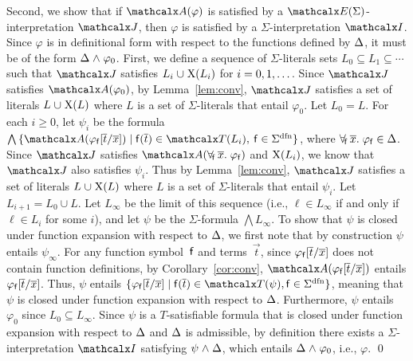\begin{longv}
\begin{proofsketch}
Second, we show that if $\conv( \varphi )$ is satisfied by a
$\extendsig{\Sigma}$-interpretation $\J$, then $\varphi$ is satisfied by a
$\Sigma$-interpretation $\I$. Since $\varphi$ is in definitional form with
respect to the functions defined by $\DDD$, it must be of the form
$\DDD \wedge \varphi_0$. 
First, we define a sequence of $\Sigma$-literals sets $L_0 \subseteq L_1 \subseteq \cdots$
such that $\J$ satisfies $L_i \cup \absconstraints( L_i )$ for $i = 0, 1, \ldots\vthinspace$.
Since $\J$ satisfies $\conv( \varphi_0 )$,
by Lemma~\ref{lem:conv}, 
$\J$ satisfies a set of literals $L \cup \absconstraints( L )$ where $L$ is a set of $\Sigma$-literals that entail $\varphi_0$.
Let $L_0 = L$.
For each $i \geq 0$,
let $\psi_i$ be the formula $\bigwedge\, \{ \conv( \varphi_{\con{f}}[ \vec t / \vec x ] ) \mid \con{f}( \vec t ) \in \terms( L_i ),\: \con{f} \in \sfundefs{\Sigma} \}$,
where $\forallf{\con{f}} \vec x.\; \varphi_{\con{f}} \in \DDD$.
Since $\J$ satisfies $\conv( \forallf{\con{f}} \vec x.\; \varphi_{\con{f}} )$ and $\mathrm{X}( L_i )$,
we know that $\J$ also satisfies $\psi_i$.
Thus by Lemma~\ref{lem:conv},
$\J$ satisfies a set of literals $L \cup \absconstraints( L )$ where $L$ is a set of $\Sigma$-literals that entail $\psi_i$.
Let $L_{i+1} = L_0 \cup L$.
Let $L_\infty$ be the limit of this sequence (i.e., $\ell \in L_\infty$ if and only if
$\ell \in L_i$ for some $i$),
and let $\psi$ be the $\Sigma$-formula $\bigwedge L_\infty$.
To show that $\psi$ is closed under function expansion with respect to $\DDD$,
we first note that by construction $\psi$ entails $\psi_\infty$.
For any function symbol~$\mathsf{f}$ and terms~$\vec t$, since $\varphi_{\mathsf{f}}[ \overline{t} / \overline{x} ]$ does not contain function definitions,
by Corollary~\ref{cor:conv},
$\conv( \varphi_{\con{f}}[ \vec t / \vec x ] )$ entails $\varphi_{\mathsf{f}}[ \overline{t} / \overline{x} ]$.
Thus, $\psi$ entails $\{ \varphi_{\con{f}}[ \vec t / \vec x ] \mid \con{f}( \vec t ) \in \terms( \psi ), \con{f} \in \sfundefs{\Sigma} \}$,
meaning that $\psi$ is closed under function expansion with respect to $\DDD$.
Furthermore, $\psi$ entails $\varphi_0$ since $L_0 \subseteq L_\infty$.
Since $\psi$ is a $T$-satisfiable formula that is closed under function expansion with respect to $\DDD$ and $\DDD$ is admissible, 
by definition there exists a $\Sigma$-interpretation $\I$ satisfying $\psi \wedge \DDD$, which entails $\DDD \wedge \varphi_0$,
i.e., $\varphi$.
\qed
\end{proofsketch}


\end{longv}

